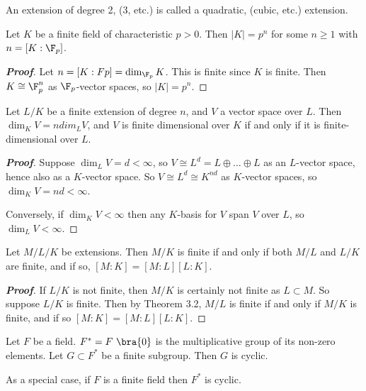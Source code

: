 \begin{remark}
An extension of degree 2, (3, etc.) is called a quadratic, (cubic, etc.) extension.
\end{remark}

\begin{theorem}
Let $K$ be a finite field of characteristic $p > 0$. Then $|K| = p^n$ for some $n \geq 1$ with $n = [K : \F_p]$.
\end{theorem}

\begin{proof}[\bf Proof]
Let $n = [K : Fp] = \dim_{\F_p} K$. This is finite since $K$ is finite. Then $K \cong \F^n_p$ as $\F_p$-vector spaces, so $|K| = p^n$.
\end{proof}

\begin{theorem}
Let $L/K$ be a finite extension of degree $n$, and $V$ a vector space over $L$. Then $\dim_K V = n dim_L V$, and $V$ is finite dimensional over $K$ if and only if it is finite-dimensional over $L$.
\end{theorem}

\begin{proof}[\bf Proof]
Suppose $\dim_L V = d < \infty$, so $V \cong L^d = L \oplus  \dots\oplus  L$ as an $L$-vector space, hence also as a $K$-vector space. So $V \cong L^d \cong K^{nd}$ as $K$-vector spaces, so $\dim_K V = nd < \infty$.

Conversely, if $\dim_K V < \infty$ then any $K$-basis for $V$ span $V$ over $L$, so $\dim_L V < \infty$.
\end{proof}

\begin{corollary}
Let $M/L/K$ be extensions. Then $M/K$ is finite if and only if both $M/L$ and $L/K$ are finite, and if so, $[M : K] = [M : L][L : K]$.
\end{corollary}

\begin{proof}[\bf Proof]
If $L/K$ is not finite, then $M/K$ is certainly not finite as $L \subset M$. So suppose $L/K$ is finite. Then by Theorem 3.2, $M/L$ is finite if and only if $M/K$ is finite, and if so $[M : K] = [M : L][L : K]$.
\end{proof}

\begin{proposition}
Let $F$ be a field. $F^* = F \ \bra{0}$ is the multiplicative group of its non-zero elements. Let $G \subset F^*$ be a finite subgroup. Then $G$ is cyclic.

As a special case, if $F$ is a finite field then $F^*$ is cyclic.
\end{proposition}

